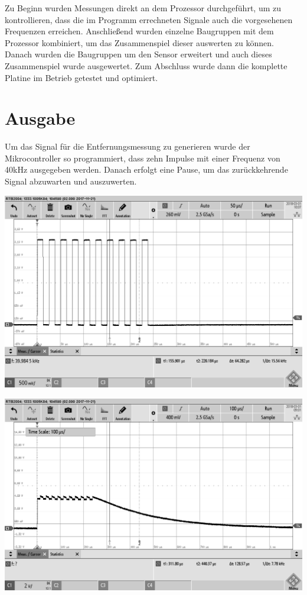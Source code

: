 
Zu Beginn wurden Messungen direkt an dem Prozessor durchgeführt, um zu kontrollieren, dass die im Programm errechneten Signale auch die vorgesehenen Frequenzen erreichen. Anschließend wurden einzelne Baugruppen mit dem Prozessor kombiniert, um das Zusammenspiel dieser auswerten zu können. Danach wurden die Baugruppen um den Sensor erweitert und auch dieses Zusammenspiel wurde ausgewertet. Zum Abschluss wurde dann die komplette Platine im Betrieb getestet und optimiert.

\section{Ausgabe}
Um das Signal für die Entfernungsmessung zu generieren wurde der Mikrocontroller so programmiert, dass zehn Impulse mit einer Frequenz von 40kHz ausgegeben werden. Danach erfolgt eine Pause, um das zurückkehrende Signal abzuwarten und auszuwerten.\\
\begin{minipage}{0.5\textwidth}
\includegraphics[width=1\textwidth, draft]{Abbildungen/PWM-von-der-cpu.png}
\label{fig:pwm-burst}
\end{minipage}
\begin{minipage}{0.5\textwidth}
\includegraphics[width=1\textwidth, draft]{Abbildungen/PWM-ausgabe-mit-Hi-Side.png}
\label{fig:HiSide}
\end{minipage}

